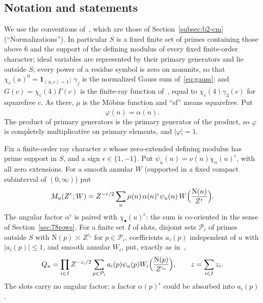 \documentclass[11pt]{article}
\numberwithin{equation}{section}
\newcommand{\N}{\mathrm N}
\newcommand{\ind}{\mathbf1}
\begin{document}
\subsection{Notation and statements}\label{sec:s4-statements}
We use the conventions of~\cite[Section~4]{OAI78}, which are those of
Section~\ref{subsec:b2-cm} (``Normalizations''). In particular $S$ is a fixed finite set of primes containing
those above $6$ and the support of the defining modulus of every fixed finite-order character; ideal variables
are represented by their primary generators and lie outside $S$; every power of a residue symbol is zero on
nonunits, so that $\chi_c(a)^0=\ind_{(a,c)=1}$; $\gamma_j$ is the normalized Gauss sum of~\eqref{eq:gauss}; and
$G(c)=\overline{\chi_c(4)}\Gamma(c)$ is the finite-ray function of~\cite[Lemma~4.4]{OAI78}, equal to $\overline{\chi_c(4)}\gamma_3(c)$ for squarefree $c$. As there, $\mu$ is the M\"obius
function and ``sf'' means squarefree. Put
\begin{equation}\label{eq:d170}
 \varphi(n)=\overline{\alpha(n)} .
\end{equation}
The product of primary generators is the primary generator of the product, so $\varphi$ is completely
multiplicative on primary elements, and $|\varphi|=1$.

Fix a finite-order ray character $\nu$ whose zero-extended defining modulus has prime support in $S$, and a
sign $\epsilon\in\{1,-1\}$. Put $\psi_u(n)=\nu(n)\chi_n(u)^{\epsilon}$, with all zero extensions. For a smooth
annular $W$ (supported in a fixed compact subinterval of $(0,\infty)$) put
\begin{equation}\label{eq:s4-M}
 M_u(Z^r;W)=Z^{-r/2}\sum_n\mu(n)\,\alpha(n)^{\epsilon}\psi_u(n)\,W\Bigl(\frac{\N(n)}{Z^r}\Bigr).
\end{equation}
The angular factor $\alpha^\epsilon$ is paired with $\chi_\bullet(u)^\epsilon$: the sum is co-oriented in the
sense of Section~\ref{sec:78rows}. For a finite set $I$ of slots, disjoint sets $\mathcal P_i$ of primes outside
$S$ with $\N(p)\asymp Z^{z_i}$ for $p\in\mathcal P_i$, coefficients $a_i(p)$ independent of $u$ with
$|a_i(p)|\le1$, and smooth annular $W_i$, put, exactly as in~\cite[Section~17.1]{OAI78},
\begin{equation}\label{eq:d171}
 Q_u=\prod_{i\in I}Z^{-z_i/2}\sum_{p\in\mathcal P_i}a_i(p)\psi_u(p)W_i\Bigl(\frac{\N(p)}{Z^{z_i}}\Bigr),
 \qquad z=\sum_{i\in I}z_i .
\end{equation}
The slots carry no angular factor; a factor $\alpha(p)^\epsilon$ could be absorbed into $a_i(p)$.
\end{document}
